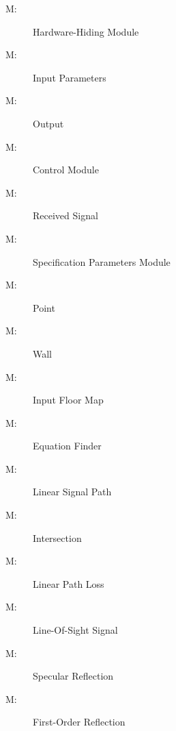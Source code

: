 \documentclass[12pt, titlepage]{article}
\newcounter{mnum}
\newcommand{\mthemnum}{M\themnum}
\begin{document}
\begin{description}
\item [ \mthemnum \label{mHH}:] Hardware-Hiding Module
\item [ \mthemnum \label{mIP}:] Input Parameters
\item [ \mthemnum \label{mO}:] Output
\item [ \mthemnum \label{mCM}:] Control Module
\item [ \mthemnum \label{mRS}:] Received Signal
\item [ \mthemnum \label{mSPM}:] Specification Parameters Module
\item [ \mthemnum \label{mP}:] Point
\item [ \mthemnum \label{mW}:] Wall
\item [ \mthemnum \label{mFM}:] Input Floor Map
\item [ \mthemnum \label{mEF}:] Equation Finder
\item [ \mthemnum \label{mLSP}:] Linear Signal Path
\item [ \mthemnum \label{mI}:] Intersection
\item [ \mthemnum \label{mLPL}:] Linear Path Loss
\item [ \mthemnum \label{mLOS}:] Line-Of-Sight Signal
\item [ \mthemnum \label{mSR}:] Specular Reflection
\item [ \mthemnum \label{mFORS}:] First-Order Reflection
\end{description}
\end{document}
